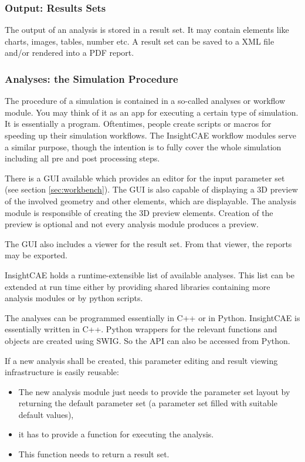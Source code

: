 \subsubsection{Output: Results Sets}

The output of an analysis is stored in a result set. 
It may contain elements like charts, images, tables, number etc.
A result set can be saved to a XML file and/or rendered into a PDF report.

\subsubsection{Analyses: the Simulation Procedure}

The procedure of a simulation is contained in a so-called analyses or workflow module.
You may think of it as an app for executing a certain type of simulation.
It is essentially a program.
Oftentimes, people create scripts or macros for speeding up their simulation workflows.
The InsightCAE workflow modules serve a similar purpose, though the intention is to fully cover the whole simulation including all pre and post processing steps.

There is a GUI available which provides an editor for the input parameter set (see section \ref{sec:workbench}).
The GUI is also capable of displaying a 3D preview of the involved geometry and other elements, which are displayable.
The analysis module is responsible of creating the 3D preview elements.
Creation of the preview is optional and not every analysis module produces a preview.

The GUI also includes a viewer for the result set. From that viewer, the reports may be exported.

InsightCAE holds a runtime-extensible list of available analyses.
This list can be extended at run time either by providing shared libraries containing more analysis modules or by python scripts.

The analyses can be programmed essentially in C++ or in Python.
InsightCAE is essentially written in C++. Python wrappers for the relevant functions and objects are created using SWIG. So the API can also be accessed from Python.

If a new analysis shall be created, this parameter editing and result viewing infrastructure is easily reusable:
\begin{itemize}
\item The new analysis module just needs to provide the parameter set layout by returning the default parameter set (a parameter set filled with suitable default values),
\item it has to provide a function for executing the analysis.
\item This function needs to return a result set.
\end{itemize}

